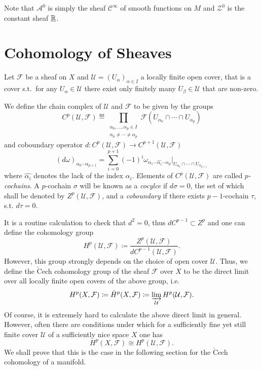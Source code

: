 \documentclass[11pt]{preprint}
\def\cA{\mathscr{A}}
\def\cZ{\mathscr{Z}}
\numberwithin{equation}{section}
\begin{document}
\begin{remark}
  Note that $\cA^0$ is simply the sheaf $\mathscr C^\infty$ of smooth functions on $M$ and $\cZ^0$ is the constant sheaf $\underline{{\mathbb R}}$.
\end{remark}

\section{Cohomology of Sheaves}

Let $\mathcal F$ be a sheaf on $X$ and $\mathcal U = \left(U_\alpha\right)_{\alpha \in I}$ a locally finite open cover, that is a cover s.t.\ for any $U_\alpha \in \mathcal U$ there exist only finitely many $U_\beta \in \mathcal U$ that are non-zero.

We define the chain complex of $\mathcal U$ and $\mathcal F$ to be given by the groups 
\[
  C^p(\mathcal U, \mathcal F) \eqdef \prod_{\substack{\alpha_0, \dots, \alpha_p \in I \\ \alpha_0 \neq \cdots \neq \alpha_p }} \mathcal F \left( U_{\alpha_0} \cap \cdots \cap U_{\alpha_p} \right)  
\]
and coboundary operator $d : C^p(\mathcal U, \mathcal F) \to C^{p+1}(\mathcal U, \mathcal F)$
\[
  \left(d \omega\right)_{\alpha_0 \cdots \alpha_{p+1}} =  \sum_{i = 0}^{p+1} (-1)^{i} \omega_{\alpha_1 \cdots \widehat{\alpha_i} \cdots \alpha_p} \big|_{U_{\alpha_0} \cap \cdots \cap U_{\alpha_{p+1}} }   
\]
where $\widehat{\alpha_i}$ denotes the lack of the index $\alpha_i$. Elements of $C^p(\mathcal U, \mathcal F)$ are called \textit{$p$-cochains}. A $p$-cochain $\sigma$ will be known as a \textit{cocylce} if $d\sigma = 0$, the set of which shall be denoted by $Z^p(\mathcal U, \mathcal F)$, and a \textit{coboundary} if there exists $p-1$-cochain $\tau$, s.t. $d\tau = 0$. 

It is a routine calculation to check that $d^2 = 0$, thus $d C^{p-1} \subset Z^p$ and one can define the cohomology group
\[
  H^p(\mathcal U, \mathcal F) \coloneqq \frac{Z^p(\mathcal U,\mathcal F)}{dC^{p-1}(\mathcal U,\mathcal F)}.
\]
However, this group strongly depends on the choice of open cover $\mathcal U$. Thus, we define the $\check{\mathrm{C}}$ech cohomology group of the sheaf $\mathcal F$ over $X$ to be the direct limit over all locally finite open covers of the above group, i.e.\ 
\[
  H^p(X,\mathcal F)  \coloneqq  \check H^p(X,\mathcal F)  \coloneqq \varinjlim_{\mathcal U}   H^p(\mathcal U, \mathcal F).
\] 
Of course, it is extremely hard to calculate the above direct limit in general. However, often there are conditions under which for a sufficiently fine yet still finite cover $\mathcal U$ of a sufficiently nice space $X$ one has 
\[
  H^p(X,\mathcal F)  \cong  H^p(\mathcal U, \mathcal F).
\]
We shall prove that this is the case in the following section for the $\check{\mathrm{C}}$ech cohomology of a manifold.
\end{document}
